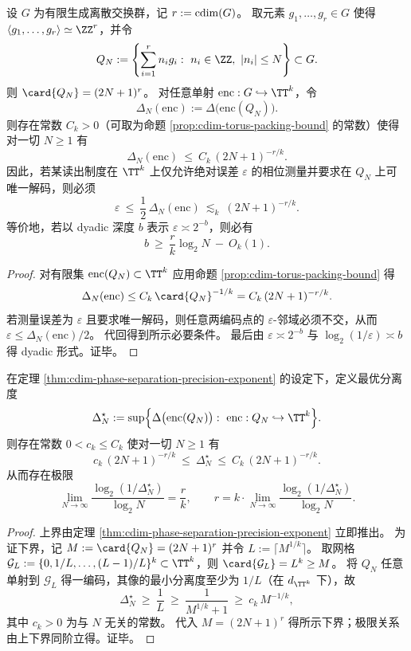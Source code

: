 \begin{theorem}[结构圆维的相位可分辨率定标]\label{thm:cdim-phase-separation-precision-exponent}
设 \(G\) 为有限生成离散交换群，记 \(r:=\operatorname{cdim}(G)\)。
取元素 \(g_1,\dots,g_r\in G\) 使得 \(\langle g_1,\dots,g_r\rangle\simeq\ZZ^r\)，并令
\[
Q_N:=\left\{\sum_{i=1}^{r}n_i g_i:\ n_i\in\ZZ,\ |n_i|\le N\right\}\subset G.
\]
则 \(\card{Q_N}=(2N+1)^r\)。
对任意单射 \(\mathrm{enc}:G\hookrightarrow\TT^k\)，令
\[
\Delta_N(\mathrm{enc})
:=\Delta\bigl(\mathrm{enc}(Q_N)\bigr).
\]
则存在常数 \(C_k>0\)（可取为命题 \ref{prop:cdim-torus-packing-bound} 的常数）使得对一切 \(N\ge 1\) 有
\[
\Delta_N(\mathrm{enc})\ \le\ C_k\,(2N+1)^{-r/k}.
\]
因此，若某读出制度在 \(\TT^k\) 上仅允许绝对误差 \(\varepsilon\) 的相位测量并要求在 \(Q_N\) 上可唯一解码，则必须
\[
\varepsilon\ \le\ \frac12\,\Delta_N(\mathrm{enc})\ \lesssim_k\ (2N+1)^{-r/k}.
\]
等价地，若以 dyadic 深度 \(b\) 表示 \(\varepsilon\asymp 2^{-b}\)，则必有
\[
b\ \ge\ \frac{r}{k}\log_2 N\ -\ O_k(1).
\]
\end{theorem}
\begin{proof}
对有限集 \(\mathrm{enc}(Q_N)\subset\TT^k\) 应用命题 \ref{prop:cdim-torus-packing-bound} 得
\[
\Delta_N(\mathrm{enc})
\le
C_k\,\card{Q_N}^{-1/k}
=C_k\,(2N+1)^{-r/k}.
\]
若测量误差为 \(\varepsilon\) 且要求唯一解码，则任意两编码点的 \(\varepsilon\)-邻域必须不交，从而 \(\varepsilon\le \Delta_N(\mathrm{enc})/2\)。
代回得到所示必要条件。
最后由 \(\varepsilon\asymp 2^{-b}\) 与 \(\log_2(1/\varepsilon)\asymp b\) 得 dyadic 形式。证毕。
\end{proof}

\begin{proposition}[精度指数的可达性与恢复公式]\label{prop:cdim-phase-separation-exponent-recovery}
在定理 \ref{thm:cdim-phase-separation-precision-exponent} 的设定下，定义最优分离度
\[
\Delta_N^\star
:=\sup\Bigl\{\Delta\bigl(\mathrm{enc}(Q_N)\bigr):\ \mathrm{enc}:Q_N\hookrightarrow\TT^k\Bigr\}.
\]
则存在常数 \(0<c_k\le C_k\) 使对一切 \(N\ge 1\) 有
\[
c_k\,(2N+1)^{-r/k}\ \le\ \Delta_N^\star\ \le\ C_k\,(2N+1)^{-r/k}.
\]
从而存在极限
\[
\lim_{N\to\infty}\frac{\log_2(1/\Delta_N^\star)}{\log_2 N}=\frac{r}{k},
\qquad
r=k\cdot \lim_{N\to\infty}\frac{\log_2(1/\Delta_N^\star)}{\log_2 N}.
\]
\end{proposition}
\begin{proof}
上界由定理 \ref{thm:cdim-phase-separation-precision-exponent} 立即推出。
为证下界，记 \(M:=\card{Q_N}=(2N+1)^r\) 并令 \(L:=\lceil M^{1/k}\rceil\)。
取网格
\(
\mathcal{G}_L:=\{0,1/L,\dots,(L-1)/L\}^k\subset\TT^k
\)，则 \(\card{\mathcal{G}_L}=L^k\ge M\)。
将 \(Q_N\) 任意单射到 \(\mathcal{G}_L\) 得一编码，其像的最小分离度至少为 \(1/L\)（在 \(d_{\TT^k}\) 下），故
\[
\Delta_N^\star\ \ge\ \frac{1}{L}\ \ge\ \frac{1}{M^{1/k}+1}\ \ge\ c_k\,M^{-1/k},
\]
其中 \(c_k>0\) 为与 \(N\) 无关的常数。
代入 \(M=(2N+1)^r\) 得所示下界；极限关系由上下界同阶立得。证毕。
\end{proof}

